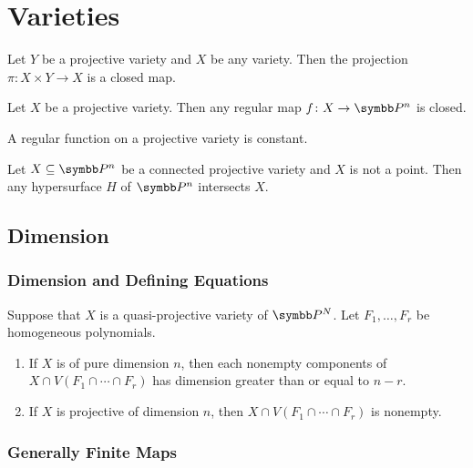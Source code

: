 
\chapter{Varieties}

\begin{theorem}
  Let $Y$ be a projective variety and $X$ be any variety. Then the projection  $\pi\colon X\times Y\to X$ is a closed map.
\end{theorem}

\begin{corollary}
  Let $X$ be a projective variety. Then any regular map $f\colon X\to \PP^n$ is closed.
\end{corollary}

\begin{corollary}
  A regular function on a projective variety is constant.
\end{corollary}

\begin{corollary}
  Let $X\subseteq \PP^n$ be a connected projective variety and $X$ is not a point. Then any hypersurface $H$ of $\PP^n$ intersects $X$.
\end{corollary}

\section{Dimension}

\subsection{Dimension and Defining Equations}

\begin{theorem}
  Suppose that $X$ is a quasi-projective variety of $\PP^N$. Let $F_1, \dotsc, F_r$ be homogeneous polynomials.
  \begin{enumerate}
    \item If $X$ is of pure dimension $n$, then each nonempty components of $X\cap V(F_1\cap \dotsb\cap F_r)$ has dimension greater than or equal to $n-r$.
    \item If $X$ is projective of dimension $n$, then $X\cap V(F_1\cap \dotsb\cap F_r)$ is nonempty.
  \end{enumerate}
\end{theorem}

\subsection{Generally Finite Maps}

